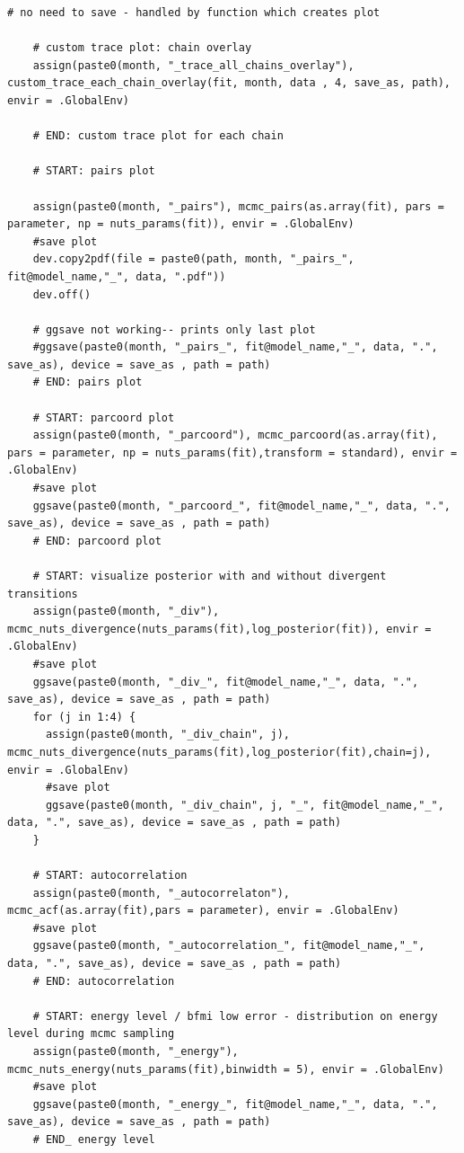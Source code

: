 \documentclass[ngerman]{ttlab-qualify}
\begin{document}
\begin{lstlisting}[style=custom, caption={\textit{R}-Script zur Erstellung verschiedener Diagnose-Plots},label={r:all-plots}]
    # no need to save - handled by function which creates plot
    
    # custom trace plot: chain overlay
    assign(paste0(month, "_trace_all_chains_overlay"), custom_trace_each_chain_overlay(fit, month, data , 4, save_as, path), envir = .GlobalEnv)
    
    # END: custom trace plot for each chain
    
    # START: pairs plot
    
    assign(paste0(month, "_pairs"), mcmc_pairs(as.array(fit), pars = parameter, np = nuts_params(fit)), envir = .GlobalEnv)
    #save plot
    dev.copy2pdf(file = paste0(path, month, "_pairs_", fit@model_name,"_", data, ".pdf"))
    dev.off()
    
    # ggsave not working-- prints only last plot
    #ggsave(paste0(month, "_pairs_", fit@model_name,"_", data, ".", save_as), device = save_as , path = path)
    # END: pairs plot
    
    # START: parcoord plot
    assign(paste0(month, "_parcoord"), mcmc_parcoord(as.array(fit), pars = parameter, np = nuts_params(fit),transform = standard), envir = .GlobalEnv)
    #save plot
    ggsave(paste0(month, "_parcoord_", fit@model_name,"_", data, ".", save_as), device = save_as , path = path)
    # END: parcoord plot
    
    # START: visualize posterior with and without divergent transitions
    assign(paste0(month, "_div"), mcmc_nuts_divergence(nuts_params(fit),log_posterior(fit)), envir = .GlobalEnv)
    #save plot
    ggsave(paste0(month, "_div_", fit@model_name,"_", data, ".", save_as), device = save_as , path = path)
    for (j in 1:4) {
      assign(paste0(month, "_div_chain", j), mcmc_nuts_divergence(nuts_params(fit),log_posterior(fit),chain=j), envir = .GlobalEnv)
      #save plot
      ggsave(paste0(month, "_div_chain", j, "_", fit@model_name,"_", data, ".", save_as), device = save_as , path = path)
    }
    
    # START: autocorrelation
    assign(paste0(month, "_autocorrelaton"), mcmc_acf(as.array(fit),pars = parameter), envir = .GlobalEnv) 
    #save plot
    ggsave(paste0(month, "_autocorrelation_", fit@model_name,"_", data, ".", save_as), device = save_as , path = path)
    # END: autocorrelation
    
    # START: energy level / bfmi low error - distribution on energy level during mcmc sampling
    assign(paste0(month, "_energy"), mcmc_nuts_energy(nuts_params(fit),binwidth = 5), envir = .GlobalEnv)
    #save plot
    ggsave(paste0(month, "_energy_", fit@model_name,"_", data, ".", save_as), device = save_as , path = path)
    # END_ energy level


\end{lstlisting}
\end{document}

